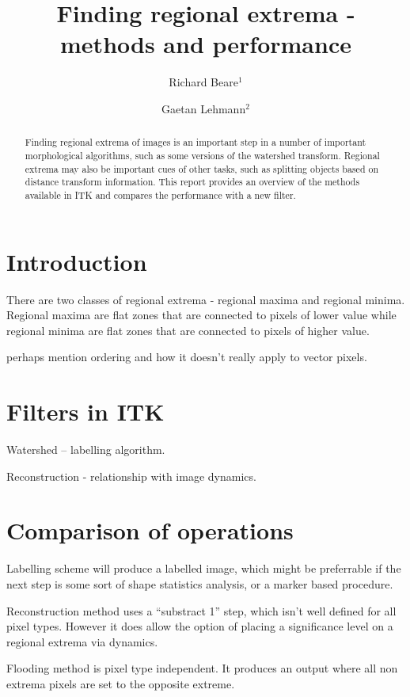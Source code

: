 \documentclass{llncs}
\begin{document}
\title{Finding regional extrema - methods and performance}
\author{Richard Beare{$^1$} \and Gaetan Lehmann{$^2$}}
\maketitle

\begin{abstract}
Finding regional extrema of images is an important step in a number of
important morphological algorithms, such as some versions of the
watershed transform. Regional extrema may also be important cues of
other tasks, such as splitting objects based on distance transform
information. This report provides an overview of the methods available
in ITK and compares the performance with a new filter.
\end{abstract}

\section{Introduction}
There are two classes of regional extrema - regional maxima and
regional minima. Regional maxima are flat zones that are connected to
pixels of lower value while regional minima are flat zones that are
connected to pixels of higher value.

perhaps mention ordering and how it doesn't really apply to vector pixels.

\section{Filters in ITK}
Watershed -- labelling algorithm.

Reconstruction - relationship with image dynamics.

\section{Comparison of operations}
Labelling scheme will produce a labelled image, which might be
preferrable if the next step is some sort of shape statistics
analysis, or a marker based procedure.

Reconstruction method uses a ``substract 1'' step, which isn't well
defined for all pixel types. However it does allow the option of
placing a significance level on a regional extrema via dynamics.

Flooding method is pixel type independent. It produces an output where
all non extrema pixels are set to the opposite extreme.
\end{document}
